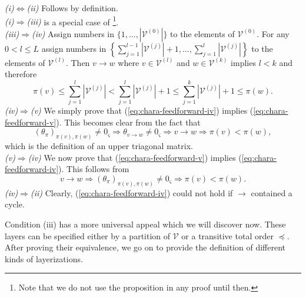 \documentclass[a4paper,11pt]{report}
\newcommand{\const}{\varsigma} %
\begin{document}
\begin{Bew}
\textit{(i)$\Leftrightarrow$(ii)}
Follows by definition.\\
\textit{(i)$\Rightarrow$(iii)}
is a special case of \footnote{
Note that we do not use the proposition in any proof until then.}.\\
\textit{(iii)$\Rightarrow$(iv)}
Assign numbers in $\{1,\dotsc,|\mathcal{V}^{(0)}|\}$ to the elements of $\mathcal{V}^{(0)}$. For any $0<l\le L$ assign numbers in $\left\{\sum_{j=1}^{l-1}|\mathcal{V}^{(j)}|+1,\dotsc,\sum_{j=1}^{l}|\mathcal{V}^{(j)}|\right\}$ to the elements of $\mathcal{V}^{(l)}$. Then $v\to w$ where $v\in\mathcal{V}^{(l)}$ and $w\in\mathcal{V}^{(k)}$ implies $l<k$ and therefore 
\[
\pi(v)\le \sum_{j=1}^{l}|\mathcal{V}^{(j)}|<\sum_{j=1}^{l}|\mathcal{V}^{(j)}|+1\le \sum_{j=1}^{k}|\mathcal{V}^{(j)}|+1\le\pi(w).
\]
\textit{(iv)$\Rightarrow$(v)}
We simply prove that (\ref{eq:chara-feedforward-iv}) implies (\ref{eq:chara-feedforward-v}). This becomes clear from the fact that 
\[
(\theta_{\pi})_{\pi(v),\pi(w)}\ne0_{\const}\Rightarrow\theta_{v\to w}\ne0_{\const}\Rightarrow v\to w\Rightarrow\pi(v)<\pi(w),
\]
which is the definition of an upper triagonal matrix.\\
\textit{(v)$\Rightarrow$(iv)}
We now prove that (\ref{eq:chara-feedforward-v}) implies (\ref{eq:chara-feedforward-iv}). This follows from
\[
v\to w\Rightarrow(\theta_{\pi})_{\pi(v),\pi(w)}\ne0_{\const}\Rightarrow\pi(v)<\pi(w).
\]
\textit{(iv)$\Rightarrow$(ii)}
Clearly, (\ref{eq:chara-feedforward-iv}) could not hold if $\to$ contained a cycle.
\end{Bew}

\begin{Par}
Condition (iii) has a more universal appeal which we will discover now. These layers can be specified either by a partition of $\mathcal{V}$ or a transitive total order $\preceq$. After proving their equivalence, we go on to provide the definition of different kinds of layerizations.
\end{Par}
\end{document}
